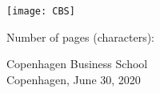 \begin{titlepage}
\begin{center}
 
 
       \vspace{1cm}
 
       \texttt{[image: CBS]}
 
       \vspace{1cm}
       
       Number of pages (characters):
       
       Copenhagen Business School\\
       Copenhagen, June 30, 2020
 
   \end{center}
\end{titlepage}